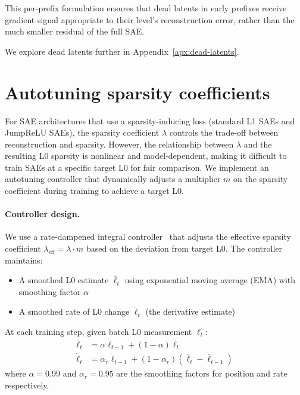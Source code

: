 \documentclass{article}
\theoremstyle{plain}
\theoremstyle{definition}
\theoremstyle{remark}
\begin{document}
This per-prefix formulation ensures that dead latents in early prefixes receive gradient signal appropriate to their level's reconstruction error, rather than the much smaller residual of the full SAE.

We explore dead latents further in Appendix~\ref{apx:dead-latents}.

\section{Autotuning sparsity coefficients}
\label{apx:autotune}

For SAE architectures that use a sparsity-inducing loss (standard L1 SAEs and JumpReLU SAEs), the sparsity coefficient $\lambda$ controls the trade-off between reconstruction and sparsity. However, the relationship between $\lambda$ and the resulting L0 sparsity is nonlinear and model-dependent, making it difficult to train SAEs at a specific target L0 for fair comparison. We implement an autotuning controller that dynamically adjusts a multiplier $m$ on the sparsity coefficient during training to achieve a target L0.

\paragraph{Controller design.} We use a rate-dampened integral controller~\citep{aastrom2021feedback} that adjusts the effective sparsity coefficient $\lambda_{\text{eff}} = \lambda \cdot m$ based on the deviation from target L0. The controller maintains:

\begin{itemize}
    \item A smoothed L0 estimate $\bar{\ell}_t$ using exponential moving average (EMA) with smoothing factor $\alpha$
    \item A smoothed rate of L0 change $\dot{\ell}_t$ (the derivative estimate)
\end{itemize}

At each training step, given batch L0 measurement $\ell_t$:
\begin{align}
    \bar{\ell}_t &= \alpha \bar{\ell}_{t-1} + (1 - \alpha) \ell_t \\
    \dot{\ell}_t &= \alpha_r \dot{\ell}_{t-1} + (1 - \alpha_r) (\bar{\ell}_t - \bar{\ell}_{t-1})
\end{align}
where $\alpha = 0.99$ and $\alpha_r = 0.95$ are the smoothing factors for position and rate respectively.
\end{document}
